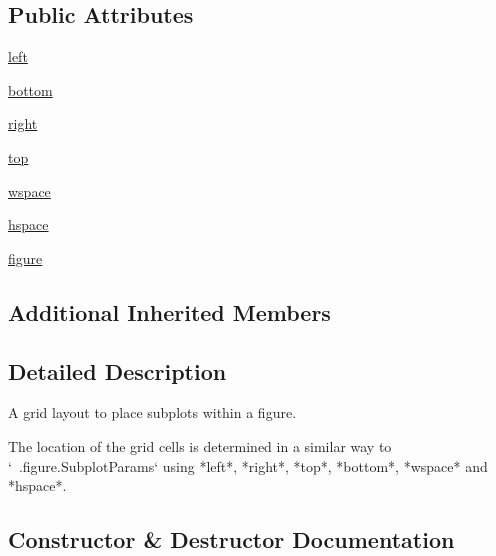 \subsection*{Public Attributes}
\begin{DoxyCompactItemize}
\item 
\hyperlink{classmatplotlib_1_1gridspec_1_1GridSpec_ac62505d756799082ce1c44951e12572b}{left}
\item 
\hyperlink{classmatplotlib_1_1gridspec_1_1GridSpec_a4fa176d6ccc57ebf0beebe077042b926}{bottom}
\item 
\hyperlink{classmatplotlib_1_1gridspec_1_1GridSpec_abe67484566b1af530a74a8e7f9381b0b}{right}
\item 
\hyperlink{classmatplotlib_1_1gridspec_1_1GridSpec_acb003c42bfa2a94d9ea12949a06af0ac}{top}
\item 
\hyperlink{classmatplotlib_1_1gridspec_1_1GridSpec_acb3157430c1133f037b691123d635a54}{wspace}
\item 
\hyperlink{classmatplotlib_1_1gridspec_1_1GridSpec_a2d426ae9004bf716c5af8785c1a01807}{hspace}
\item 
\hyperlink{classmatplotlib_1_1gridspec_1_1GridSpec_afc36985760fb67f8247aaa24a2231212}{figure}
\end{DoxyCompactItemize}
\subsection*{Additional Inherited Members}


\subsection{Detailed Description}
\begin{DoxyVerb}A grid layout to place subplots within a figure.

The location of the grid cells is determined in a similar way to
`~.figure.SubplotParams` using *left*, *right*, *top*, *bottom*, *wspace*
and *hspace*.
\end{DoxyVerb}
 

\subsection{Constructor \& Destructor Documentation}
\mbox{\label{classmatplotlib_1_1gridspec_1_1GridSpec_a6b6d1ea08e2bdae57c90672630992b3f}} 
